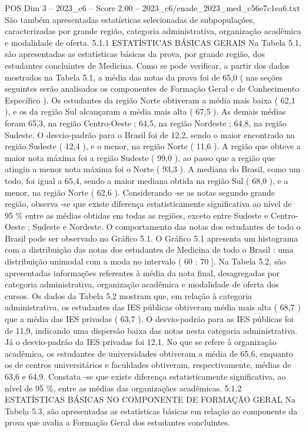 \begin{textsample}{POS Dim 3 – 2023\_c6 – Score 2.00 – 2023\_c6/enade\_2023\_med\_c56e7c1ea6.txt}
São também apresentadas estatísticas selecionadas de subpopulações, caracterizadas por grande região, categoria administrativa, organização acadêmica e modalidade de oferta. 5.1.1 ESTATÍSTICAS BÁSICAS GERAIS Na Tabela 5.1, são apresentadas as estatísticas básicas da prova, por grande região, dos estudantes concluintes de Medicina.
Como se pode verificar, a partir dos dados mostrados na Tabela 5.1, a média das notas da prova foi de 65,0 ( nas seções seguintes serão analisados os componentes de Formação Geral e de Conhecimento Específico ).
Os estudantes da região Norte obtiveram a média mais baixa ( 62,1 ), e os da região Sul alcançaram a média mais alta ( 67,5 ).
As demais médias foram 65,3, na região Centro-Oeste ; 64,5, na região Nordeste ; 64,8, na região Sudeste.
O desvio-padrão para o Brasil foi de 12,2, sendo o maior encontrado na região Sudeste ( 12,4 ), e o menor, na região Norte ( 11,6 ).
A região que obteve a maior nota máxima foi a região Sudeste ( 99,0 ), ao passo que a região que atingiu a menor nota máxima foi o Norte ( 93,3 ).
A mediana do Brasil, como um todo, foi igual a 65,4, sendo a maior mediana obtida na região Sul ( 68,0 ), e a menor, na região Norte ( 62,6 ).
Considerando -se as notas segundo grande região, observa -se que existe diferença estatisticamente significativa ao nível de 95 \% entre as médias obtidas em todas as regiões, exceto entre Sudeste e Centro-Oeste ; Sudeste e Nordeste.
O comportamento das notas dos estudantes de todo o Brasil pode ser observado no Gráfico 5.1.
O Gráfico 5.1 apresenta um histograma com a distribuição das notas dos estudantes de Medicina de todo o Brasil : uma distribuição unimodal com a moda no intervalo ( 60 ; 70 ].
Na Tabela 5.2, são apresentadas informações referentes à média da nota final, desagregadas por categoria administrativa, organização acadêmica e modalidade de oferta dos cursos.
Os dados da Tabela 5.2 mostram que, em relação à categoria administrativa, os estudantes das IES públicas obtiveram média mais alta ( 68,7 ) que a média das IES privadas ( 63,7 ).
O desvio-padrão para as IES públicas foi de 11,9, indicando uma dispersão baixa das notas nesta categoria administrativa.
Já o desvio-padrão da IES privadas foi 12,1.
No que se refere à organização acadêmica, os estudantes de universidades obtiveram a média de 65,6, enquanto os de centros universitários e faculdades obtiveram, respectivamente, médias de 63,6 e 64,9.
Constata -se que existe diferença estatisticamente significativa, ao nível de 95 \%, entre as médias das organizações acadêmicas. 5.1.2 ESTATÍSTICAS BÁSICAS NO COMPONENTE DE FORMAÇÃO GERAL Na Tabela 5.3, são apresentadas as estatísticas básicas em relação ao componente da prova que avalia a Formação Geral dos estudantes concluintes.

\end{textsample}

